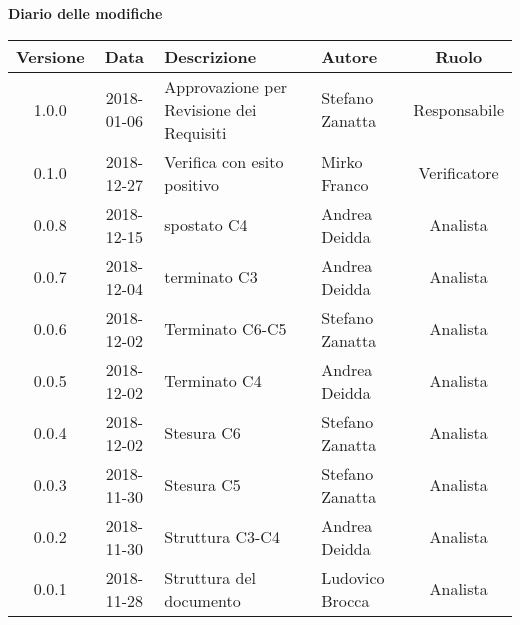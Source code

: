 \begin{center}
		\textbf{Diario delle modifiche}
	\end{center}
	\begin{center}
		\begin{tabularx}{\textwidth}{|c|c|X|X|c|}
			\hline
			\textbf{Versione} & \textbf{Data} & \textbf{Descrizione} & \textbf{Autore} & \textbf{Ruolo} \\
			\hline
			1.0.0 & 2018-01-06 & Approvazione per Revisione dei Requisiti & Stefano Zanatta & Responsabile \\
			\hline
			0.1.0 & 2018-12-27 & Verifica con esito positivo & Mirko Franco & Verificatore \\
			\hline 
			0.0.8 &  2018-12-15 & spostato C4 & Andrea Deidda & Analista \\
			\hline
			0.0.7 &  2018-12-04 & terminato C3 & Andrea Deidda & Analista \\
			\hline
			0.0.6 & 2018-12-02 & Terminato C6-C5 & Stefano Zanatta & Analista \\
			\hline
			0.0.5 & 2018-12-02 & Terminato C4 & Andrea Deidda & Analista \\
			\hline
			0.0.4 & 2018-12-02 & Stesura C6 & Stefano Zanatta & Analista \\
			\hline
			0.0.3 & 2018-11-30 & Stesura C5 & Stefano Zanatta & Analista \\
			\hline
			0.0.2 & 2018-11-30 & Struttura C3-C4 & Andrea Deidda & Analista \\
			\hline
			0.0.1 &  2018-11-28& Struttura del documento & Ludovico Brocca & Analista\\
			\hline
		\end{tabularx}
	\end{center}
\newpage